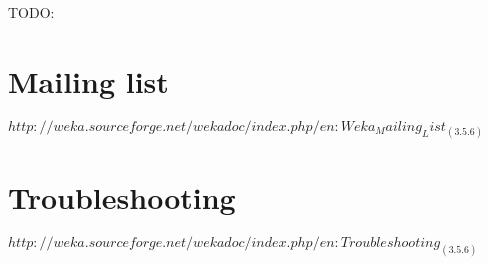 
TODO:

\section{Mailing list}
$http://weka.sourceforge.net/wekadoc/index.php/en:Weka_Mailing_List_(3.5.6)$

\section{Troubleshooting}
$http://weka.sourceforge.net/wekadoc/index.php/en:Troubleshooting_(3.5.6)$
